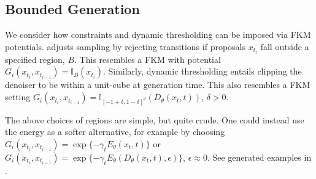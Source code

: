 \subsection{Bounded Generation}\label{sec:bounded} 
We consider how constraints \citep{lou2023reflected, fishman2024metropolis, fishmandiffusion}  and dynamic thresholding \citep{saharia2022photorealistic} can be imposed via FKM potentials. \cite{fishman2024metropolis} adjusts sampling by rejecting transitions if proposals $x_{t_i}$ fall outside a specified region, $B$. This resembles a FKM with potential $G_i(x_{t_i}, x_{t_{i-1}})= \mathbb{I}_B(x_{t_i})$. Similarly, dynamic thresholding entails clipping the denoiser to be within a unit-cube at generation time. This also resembles a FKM setting $G_i(x_{t_i}, x_{t_{i-1}})= \mathbb{I}_{[-1+\delta,1-\delta]^d}(D_\theta(x_t,t))$, $\delta>0$.

The above choices of regions are simple, but quite crude. One could instead use the energy as a softer alternative, for example by choosing $G_i(x_{t_i}, x_{t_{i-1}})=\exp\{-\gamma_tE_\theta(x_t,t)\}$ or $G_i(x_{t_i}, x_{t_{i-1}})=\exp\{-\gamma_tE_\theta(D_\theta(x_t,t),\epsilon)\}$, $\epsilon\approx0$. See generated examples in . 




